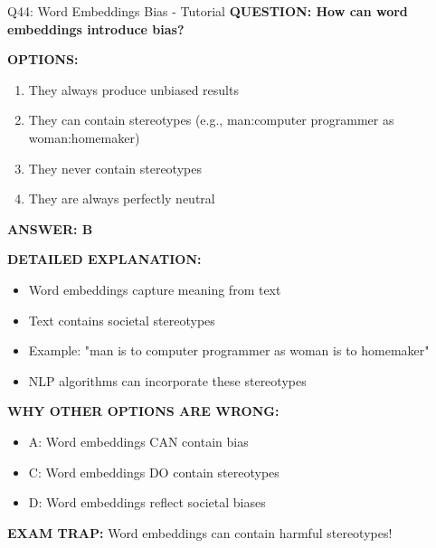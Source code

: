 \documentclass[8pt]{beamer}
\begin{document}
	\begin{frame}{Q44: Word Embeddings Bias - Tutorial}
		\fontsize{6.5}{7.5}\selectfont
		\textbf{QUESTION: How can word embeddings introduce bias?}
		
		\vspace{0.1cm}
		\textbf{OPTIONS:}
		\begin{enumerate}
			\item They always produce unbiased results
			\item They can contain stereotypes (e.g., man:computer programmer as woman:homemaker)
			\item They never contain stereotypes
			\item They are always perfectly neutral
		\end{enumerate}
		
		\vspace{0.1cm}
		\textcolor{myblue}{\textbf{ANSWER: B}}
		
		\vspace{0.1cm}
		\textbf{DETAILED EXPLANATION:}
		\begin{itemize}
			\item Word embeddings capture meaning from text
			\item Text contains societal stereotypes
			\item Example: "man is to computer programmer as woman is to homemaker"
			\item NLP algorithms can incorporate these stereotypes
		\end{itemize}
		
		\vspace{0.1cm}
		\textcolor{myred}{\textbf{WHY OTHER OPTIONS ARE WRONG:}}
		\begin{itemize}
			\item \textcolor{myred}{A:} Word embeddings CAN contain bias
			\item \textcolor{myred}{C:} Word embeddings DO contain stereotypes
			\item \textcolor{myred}{D:} Word embeddings reflect societal biases
		\end{itemize}
		
		\textcolor{myred}{\textbf{EXAM TRAP:}} Word embeddings can contain \textcolor{myblue}{harmful stereotypes}!
	\end{frame}
	
\end{document}
